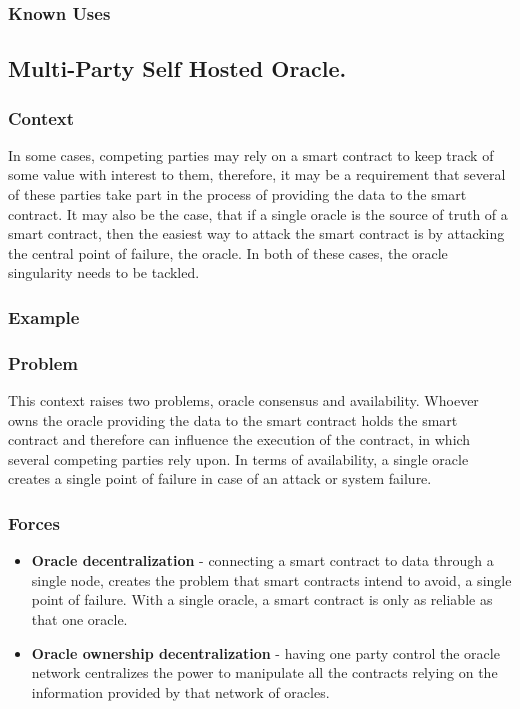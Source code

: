\subsubsection{Known Uses}

\subsection{Multi-Party Self Hosted Oracle.}\label{MPSelfHostedOracle}

\subsubsection{Context}
In some cases, competing parties may rely on a smart contract to keep track of some value with interest to them, therefore, it may be a requirement that several of these parties take part in the process of providing the data to the smart contract. It may also be the case, that if a single oracle is the source of truth of a smart contract, then the easiest way to attack the smart contract is by attacking the central point of failure, the oracle. In both of these cases, the oracle singularity needs to be tackled.

\subsubsection{Example}

\subsubsection{Problem}
This context raises two problems, oracle consensus and availability. Whoever owns the oracle providing the data to the smart contract holds the smart contract and therefore can influence the execution of the contract, in which several competing parties rely upon. In terms of availability, a single oracle creates a single point of failure in case of an attack or system failure.

\subsubsection{Forces}
\begin{itemize}
  \item \textbf{Oracle decentralization} - connecting a smart contract to data through a single node, creates the problem that smart contracts intend to avoid, a single point of failure. With a single oracle, a smart contract is only as reliable as that one oracle.
  \item \textbf{Oracle ownership decentralization} - having one party control the oracle network centralizes the power to manipulate all the contracts relying on the information provided by that network of oracles.
\end{itemize}

